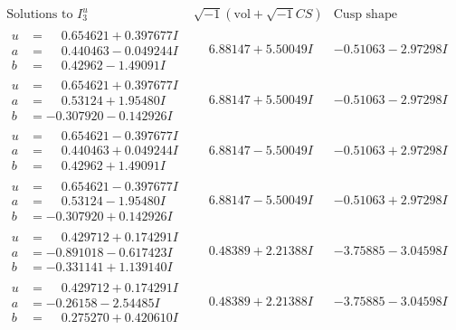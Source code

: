 \documentclass[1p]{elsarticle_modified}
\theoremstyle{definition}
\newcommand{\I}{\sqrt{-1}}
\begin{document}
$$\begin{array}{c|c|c}  
\text{Solutions to }I^u_{3}& \I (\text{vol} + \sqrt{-1}CS) & \text{Cusp shape}\\
 \hline 
\begin{aligned}
u &= \phantom{-}0.654621 + 0.397677 I \\
a &= \phantom{-}0.440463 - 0.049244 I \\
b &= \phantom{-}0.42962 - 1.49091 I\end{aligned}
 & \phantom{-}6.88147 + 5.50049 I & -0.51063 - 2.97298 I \\ \hline\begin{aligned}
u &= \phantom{-}0.654621 + 0.397677 I \\
a &= \phantom{-}0.53124 + 1.95480 I \\
b &= -0.307920 - 0.142926 I\end{aligned}
 & \phantom{-}6.88147 + 5.50049 I & -0.51063 - 2.97298 I \\ \hline\begin{aligned}
u &= \phantom{-}0.654621 - 0.397677 I \\
a &= \phantom{-}0.440463 + 0.049244 I \\
b &= \phantom{-}0.42962 + 1.49091 I\end{aligned}
 & \phantom{-}6.88147 - 5.50049 I & -0.51063 + 2.97298 I \\ \hline\begin{aligned}
u &= \phantom{-}0.654621 - 0.397677 I \\
a &= \phantom{-}0.53124 - 1.95480 I \\
b &= -0.307920 + 0.142926 I\end{aligned}
 & \phantom{-}6.88147 - 5.50049 I & -0.51063 + 2.97298 I \\ \hline\begin{aligned}
u &= \phantom{-}0.429712 + 0.174291 I \\
a &= -0.891018 - 0.617423 I \\
b &= -0.331141 + 1.139140 I\end{aligned}
 & \phantom{-}0.48389 + 2.21388 I & -3.75885 - 3.04598 I \\ \hline\begin{aligned}
u &= \phantom{-}0.429712 + 0.174291 I \\
a &= -0.26158 - 2.54485 I \\
b &= \phantom{-}0.275270 + 0.420610 I\end{aligned}
 & \phantom{-}0.48389 + 2.21388 I & -3.75885 - 3.04598 I \\ \hline\begin{aligned}

\end{aligned}
\end{array}$$
\end{document}
